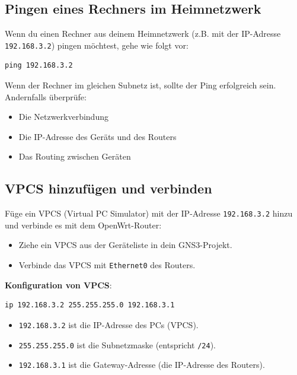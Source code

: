 \documentclass[12pt, a4paper]{article}\usepackage{listings}
\begin{document}
\subsection{Pingen eines Rechners im Heimnetzwerk}

Wenn du einen Rechner aus deinem Heimnetzwerk (z.B. mit der IP-Adresse \texttt{192.168.3.2}) pingen möchtest, gehe wie folgt vor:

\begin{verbatim}
ping 192.168.3.2
\end{verbatim}

Wenn der Rechner im gleichen Subnetz ist, sollte der Ping erfolgreich sein. Andernfalls überprüfe:
\begin{itemize}
    \item Die Netzwerkverbindung
    \item Die IP-Adresse des Geräts und des Routers
    \item Das Routing zwischen Geräten
\end{itemize}

\subsection{VPCS hinzufügen und verbinden}

Füge ein VPCS (Virtual PC Simulator) mit der IP-Adresse \texttt{192.168.3.2} hinzu und verbinde es mit dem OpenWrt-Router:

\begin{itemize}
    \item Ziehe ein VPCS aus der Geräteliste in dein GNS3-Projekt.
    \item Verbinde das VPCS mit \texttt{Ethernet0} des Routers.
\end{itemize}

\textbf{Konfiguration von VPCS}:

\begin{verbatim}
ip 192.168.3.2 255.255.255.0 192.168.3.1
\end{verbatim}

\begin{itemize}
    \item \texttt{192.168.3.2} ist die IP-Adresse des PCs (VPCS).
    \item \texttt{255.255.255.0} ist die Subnetzmaske (entspricht \texttt{/24}).
    \item \texttt{192.168.3.1} ist die Gateway-Adresse (die IP-Adresse des Routers).
\end{itemize}
\end{document}
